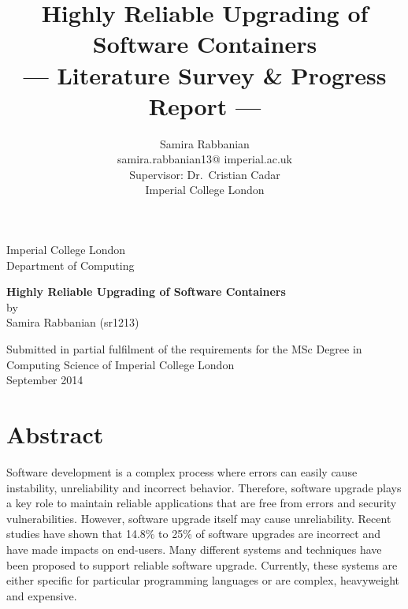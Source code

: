 \documentclass[a4paper,11pt,twoside]{report}
\title{Highly Reliable Upgrading of Software Containers\\\Large{--- Literature Survey \& Progress Report ---}}
\author{Samira Rabbanian\\
  samira.rabbanian13@ imperial.ac.uk \\
  \small{Supervisor: Dr.\ Cristian Cadar}\\
  \small{Imperial College London}}
\newcommand\blankpage{%
\null
\thispagestyle{empty}%
\addtocounter{page}{-1}%
\newpage}
\begin{document}
\maketitle

\begin{titlepage}
    \begin{center}
        \vspace*{2cm}
        
        \large
        {\Large Imperial College London}\\
        \large
         \vspace*{0.2cm}
        {\Large Department of Computing}
        
        \vspace{4.5 cm}
        \large
        {\huge \textbf{Highly Reliable Upgrading of Software Containers}}\\
        \vspace{1.0 cm}
        {\Large by}\\
        {\Large Samira Rabbanian (sr1213)}
        
        \vspace{10cm}
        

  	\large {\Large Submitted in partial fulfilment of the requirements for the MSc Degree in Computing Science of Imperial College London }\\
  	
\vspace*{1 cm}  	
  \large{\Large September 2014}\\ 
           
    \end{center}
\end{titlepage}
\afterpage{\blankpage}
\clearpage

\section*{Abstract}
Software development is a complex process where errors can easily cause instability, unreliability and incorrect behavior. Therefore, software upgrade plays a key role to maintain reliable applications that are free from errors and security vulnerabilities. However, software upgrade itself may cause unreliability. Recent studies have shown that 14.8\% to 25\% of software upgrades are incorrect and have made impacts on end-users. Many different systems and techniques have been proposed to support reliable software upgrade. Currently, these systems are either specific for particular programming languages or are complex, heavyweight and expensive.   
\end{document}
